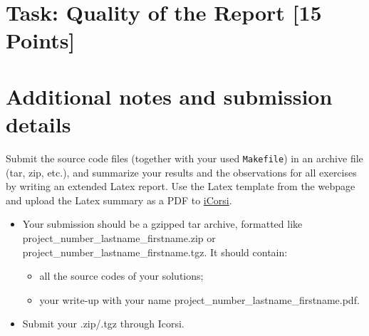 \documentclass[unicode,11pt,a4paper,oneside,numbers=endperiod,openany]{scrartcl}
\begin{document}
\section{Task: Quality of the Report [15 Points] }


\section*{Additional notes and submission details}
Submit the source code files (together with your used \texttt{Makefile}) in
an archive file (tar, zip, etc.), and summarize your results and the
observations for all exercises by writing an extended Latex report.
Use the Latex template from the webpage and upload the Latex summary
as a PDF to \href{https://www.icorsi.ch}{iCorsi}.

\begin{itemize}
	\item Your submission should be a gzipped tar archive, formatted like project\_number\_lastname\_firstname.zip or project\_number\_lastname\_firstname.tgz. 
	It should contain:
	\begin{itemize}
		\item all the source codes of your solutions;
		\item your write-up with your name  project\_number\_lastname\_firstname.pdf.
	\end{itemize}
	\item Submit your .zip/.tgz through Icorsi.
\end{itemize}
\end{document}
